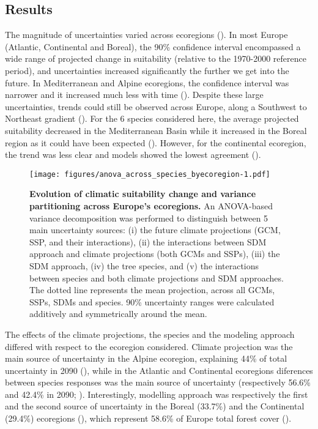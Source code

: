 \documentclass[letterpaper,8pt]{extarticle}  %
\begin{document}
\begin{doublespacing}
\begin{linenumbers}
\subsection{Results}

The magnitude of uncertainties varied across ecoregions (). In most Europe (Atlantic, Continental and Boreal), the 90\% confidence interval encompassed a wide range of projected change in suitability (relative to the 1970-2000 reference period), and uncertainties increased significantly the further we get into the future. In Mediterranean and Alpine ecoregions, the confidence interval was narrower and it increased much less with time (). Despite these large uncertainties, trends could still be observed across Europe, along a Southwest to Northeast gradient (). For the 6 species considered here, the average projected suitability decreased in the Mediterranean Basin while it increased in the Boreal region as it could have been expected (). However, for the continental ecoregion, the trend was less clear and models showed the lowest agreement ().

\begin{figure}[H]
\vspace*{0cm}
\centering
\texttt{[image: figures/anova\_across\_species\_byecoregion-1.pdf]}
\caption{\textbf{Evolution of climatic suitability change and variance partitioning across Europe's ecoregions.} An ANOVA-based variance decomposition was performed to distinguish between 5 main uncertainty sources: (i) the future climate projections (GCM, SSP, and their interactions), (ii) the interactions between SDM approach and climate projections (both GCMs and SSPs), (iii) the SDM approach, (iv) the tree species, and (v) the interactions between species and both climate projections and SDM approaches. The dotted line represents the mean projection, across all GCMs, SSPs, SDMs and species. 90\% uncertainty ranges were calculated additively and symmetrically around the mean.}
\label{fig:anovaecoregions}
\vspace*{0cm}
\end{figure}

The effects of the climate projections, the species  and the modeling approach differed with respect to the ecoregion considered. Climate projection was the main source of uncertainty in the Alpine ecoregion, explaining 44\% of total uncertainty in 2090 (), while in the Atlantic and Continental ecoregions diferences between species responses was the main source of uncertainty (respectively 56.6\% and 42.4\% in 2090; ). Interestingly, modelling approach was respectively the first and the second source of uncertainty in the Boreal (33.7\%) and the Continental (29.4\%) ecoregions (), which represent 58.6\% of Europe total forest cover ().


\end{linenumbers}
\end{doublespacing}
\end{document}
